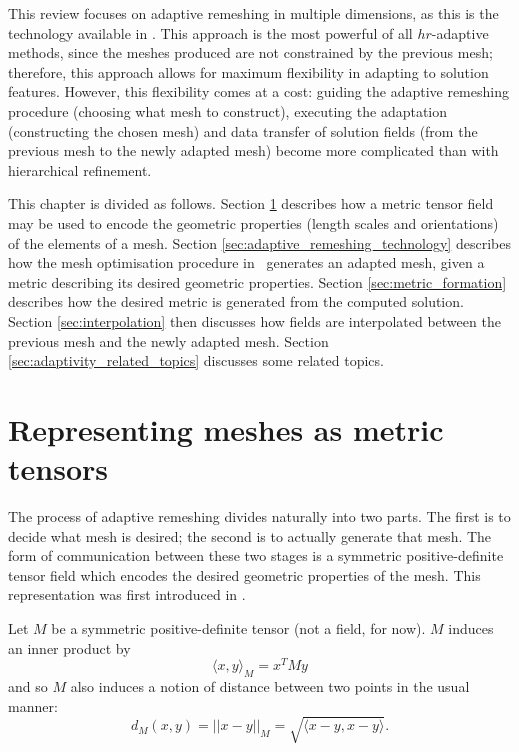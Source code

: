 This review focuses on adaptive remeshing in multiple dimensions, as this is
the technology available in \fluidity.
This approach is the most powerful of all $hr$-adaptive methods, since the meshes produced are not constrained
by the previous mesh; therefore, this approach allows for maximum flexibility in
adapting to solution features. However, this flexibility comes
at a cost: guiding the adaptive remeshing procedure (choosing
what mesh to construct), executing the adaptation (constructing
the chosen mesh) and data transfer of solution fields (from the previous mesh to
the newly adapted mesh) become more complicated than with hierarchical refinement.

This chapter is divided as follows. Section \ref{sec:meshes_and_metrics} describes how a metric tensor field
may be used to encode the geometric properties (length scales and orientations) of the
elements of a mesh. Section \ref{sec:adaptive_remeshing_technology} describes how the
mesh optimisation procedure in \fluidity\ generates an adapted mesh, given a metric
describing its desired geometric properties. Section \ref{sec:metric_formation}
describes how the desired metric is generated from the computed solution. Section
\ref{sec:interpolation} then discusses how fields are interpolated between the
previous mesh and the newly adapted mesh. Section \ref{sec:adaptivity_related_topics}
discusses some related topics.

\section{Representing meshes as metric tensors} \label{sec:meshes_and_metrics}
The process of adaptive remeshing divides naturally into two parts. The first is to
decide what mesh is desired; the second is to actually generate that mesh. The form
of communication between these two stages is a symmetric positive-definite tensor field
which encodes the desired geometric properties of the mesh. This representation was first introduced
in \citet{vallet1990}. 

Let $M$ be a symmetric positive-definite tensor (not a field, for now).
$M$ induces an inner product by
\begin{equation}
\langle x, y\rangle_M = x^T M y
\end{equation}
and so $M$ also induces a notion of distance between two points in the usual manner:
\begin{equation}
d_M(x, y) = ||x - y||_M = \sqrt{\langle x - y, x - y \rangle}.
\end{equation}

